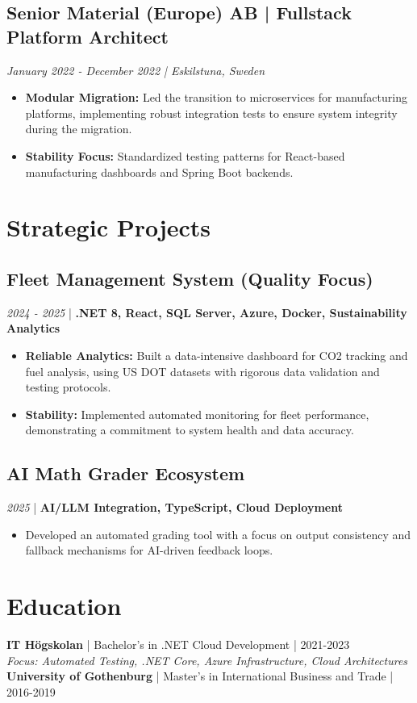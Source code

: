\documentclass[11pt,a4paper]{article}
\begin{document}
\subsection*{Senior Material (Europe) AB | Fullstack Platform Architect}
\textit{January 2022 - December 2022 | Eskilstuna, Sweden}
\begin{itemize}[noitemsep]
\item \textbf{Modular Migration:} Led the transition to microservices for manufacturing platforms, implementing robust integration tests to ensure system integrity during the migration.
\item \textbf{Stability Focus:} Standardized testing patterns for React-based manufacturing dashboards and Spring Boot backends.
\end{itemize}

\section*{Strategic Projects}

\subsection*{Fleet Management System (Quality Focus)}
\textit{2024 - 2025} | \textbf{.NET 8, React, SQL Server, Azure, Docker, Sustainability Analytics}
\begin{itemize}[noitemsep]
\item \textbf{Reliable Analytics:} Built a data-intensive dashboard for CO2 tracking and fuel analysis, using US DOT datasets with rigorous data validation and testing protocols.
\item \textbf{Stability:} Implemented automated monitoring for fleet performance, demonstrating a commitment to system health and data accuracy.
\end{itemize}

\subsection*{AI Math Grader Ecosystem}
\textit{2025} | \textbf{AI/LLM Integration, TypeScript, Cloud Deployment}
\begin{itemize}[noitemsep]
\item Developed an automated grading tool with a focus on output consistency and fallback mechanisms for AI-driven feedback loops.
\end{itemize}

\section*{Education}
\textbf{IT Högskolan} | Bachelor's in .NET Cloud Development | 2021-2023\\
\textit{Focus: Automated Testing, .NET Core, Azure Infrastructure, Cloud Architectures}\\[5pt]
\textbf{University of Gothenburg} | Master's in International Business and Trade | 2016-2019
\end{document}

